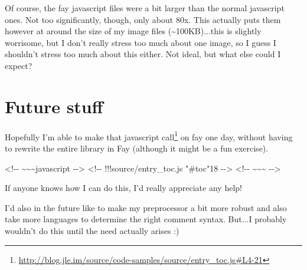 \documentclass[]{article}
\renewcommand{\href}[2]{#2\footnote{\url{#1}}}
\begin{document}
Of course, the fay javascript files were a bit larger than the normal javascript
ones. Not too significantly, though, only about 80x. This actually puts them
however at around the size of my image files (\textasciitilde{}100KB)...this is
slightly worrisome, but I don't really stress too much about one image, so I
guess I shouldn't stress too much about this either. Not ideal, but what else
could I expect?

\section{Future stuff}

Hopefully I'm able to make
\href{http://blog.jle.im/source/code-samples/source/entry_toc.js\#L4-21}{that
javascript call} on fay one day, without having to rewrite the entire library in
Fay (although it might be a fun exercise).

\textless{}!-\/- \textasciitilde{}\textasciitilde{}\textasciitilde{}javascript
-\/-\textgreater{} \textless{}!-\/- !!!source/entry\_toc.js "\#toc"18
-\/-\textgreater{} \textless{}!-\/-
\textasciitilde{}\textasciitilde{}\textasciitilde{} -\/-\textgreater{}

If anyone knows how I can do this, I'd really appreciate any help!

I'd also in the future like to make my preprocessor a bit more robust and also
take more languages to determine the right comment syntax. But...I probably
wouldn't do this until the need actually arises :)
\end{document}
